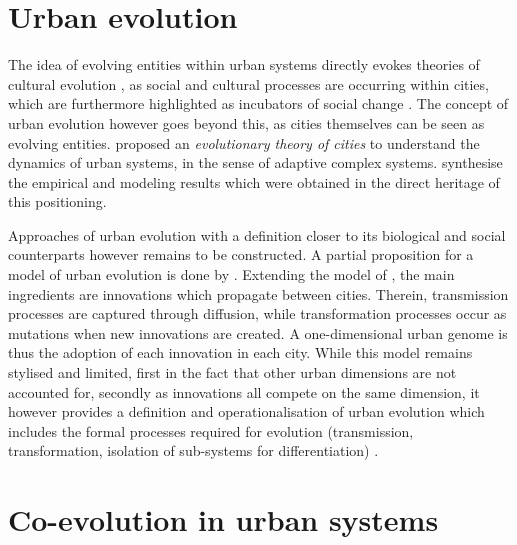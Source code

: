 \documentclass[letterpaper]{article}
\begin{document}
\section{Urban evolution}

The idea of evolving entities within urban systems directly evokes theories of cultural evolution \citep{mesoudi2016cultural}, as social and cultural processes are occurring within cities, which are furthermore highlighted as incubators of social change \citep{pumain2019complexity}. The concept of urban evolution however goes beyond this, as cities themselves can be seen as evolving entities. \cite{pumain1997pour} proposed an \emph{evolutionary theory of cities} to understand the dynamics of urban systems, in the sense of adaptive complex systems. \cite{pumain2017urban} synthesise the empirical and modeling results which were obtained in the direct heritage of this positioning.

Approaches of urban evolution with a definition closer to its biological and social counterparts however remains to be constructed. A partial proposition for a model of urban evolution is done by \cite{raimbault2020model}. Extending the model of \cite{favaro2011gibrat}, the main ingredients are innovations which propagate between cities. Therein, transmission processes are captured through diffusion, while transformation processes occur as mutations when new innovations are created. A one-dimensional urban genome is thus the adoption of each innovation in each city. While this model remains stylised and limited, first in the fact that other urban dimensions are not accounted for, secondly as innovations all compete on the same dimension, it however provides a definition and operationalisation of urban evolution which includes the formal processes required for evolution (transmission, transformation, isolation of sub-systems for differentiation) \citep{durham1991coevolution}.


\section{Co-evolution in urban systems}
\end{document}
